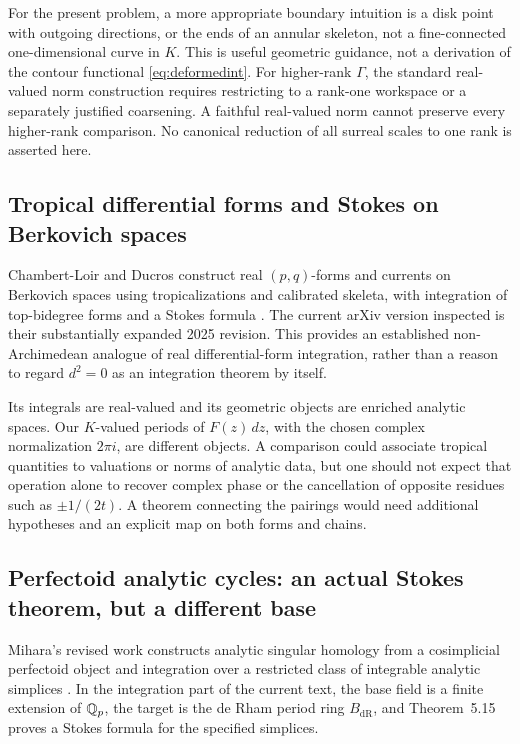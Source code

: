 \documentclass[11pt,letterpaper]{article}
\theoremstyle{definition}
\theoremstyle{remark}
\newcommand{\dR}{\mathrm{dR}}\newcommand{\sh}{^{\sharp}}\newcommand{\abs}[1]{\left|#1\right|}
\numberwithin{equation}{section}
\begin{document}
For the present problem, a more appropriate boundary intuition is a disk point with outgoing directions, or the ends of an annular skeleton, not a fine-connected one-dimensional curve in $K$. This is useful geometric guidance, not a derivation of the contour functional \eqref{eq:deformedint}. For higher-rank $\Gamma$, the standard real-valued norm construction requires restricting to a rank-one workspace or a separately justified coarsening. A faithful real-valued norm cannot preserve every higher-rank comparison. No canonical reduction of all surreal scales to one rank is asserted here.

\subsection{Tropical differential forms and Stokes on Berkovich spaces}
Chambert-Loir and Ducros construct real $(p,q)$-forms and currents on Berkovich spaces using tropicalizations and calibrated skeleta, with integration of top-bidegree forms and a Stokes formula \cite{CLD}. The current arXiv version inspected is their substantially expanded 2025 revision. This provides an established non-Archimedean analogue of real differential-form integration, rather than a reason to regard $d^2=0$ as an integration theorem by itself.

Its integrals are real-valued and its geometric objects are enriched analytic spaces. Our $K$-valued periods of $F(z)\,dz$, with the chosen complex normalization $2\pi i$, are different objects. A comparison could associate tropical quantities to valuations or norms of analytic data, but one should not expect that operation alone to recover complex phase or the cancellation of opposite residues such as $\pm1/(2t)$. A theorem connecting the pairings would need additional hypotheses and an explicit map on both forms and chains.

\subsection{Perfectoid analytic cycles: an actual Stokes theorem, but a different base}
Mihara's revised work constructs analytic singular homology from a cosimplicial perfectoid object and integration over a restricted class of integrable analytic simplices \cite{Mihara}. In the integration part of the current text, the base field is a finite extension of $\mathbb Q_p$, the target is the de Rham period ring $B_{\dR}$, and Theorem~5.15 proves a Stokes formula for the specified simplices.
\end{document}
